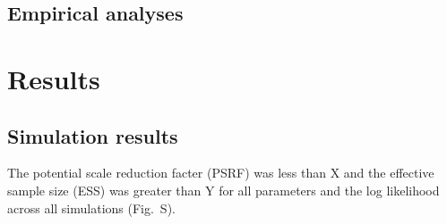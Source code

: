 \documentclass[letterpaper,12pt]{article}
\begin{document}
\subsection{Empirical analyses}

\section{Results}

\subsection{Simulation results}

The potential scale reduction facter (PSRF) was less than X and the effective
sample size (ESS) was greater than Y for all parameters and the log likelihood
across all simulations
(Fig.\ S).
\end{document}

